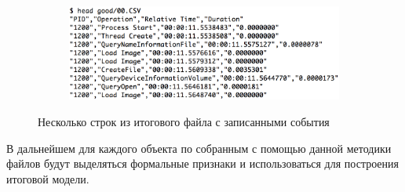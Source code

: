 \begin{figure}[ht]
	\centering
    \begin{subfigure}[b]{1\textwidth}
    \centering
        \includegraphics[scale=0.5]{csv.png}        
    \end{subfigure}
 
    \caption{Несколько строк из итогового файла с записанными события}
    \label{fig_parsetree}
\end{figure}

В дальнейшем  для каждого объекта по собранным с помощью данной методики файлов будут выделяться формальные признаки и использоваться для построения итоговой модели.